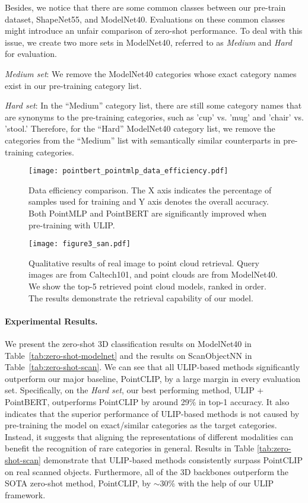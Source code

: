 Besides, we notice that there are some common classes between our pre-train dataset, ShapeNet55, and ModelNet40. Evaluations on these common classes might introduce an unfair comparison of zero-shot performance.
To deal with this issue, we create two more sets in ModelNet40, referred to as \emph{Medium} and \emph{Hard} for evaluation.

\noindent\textit{Medium set}: We remove the ModelNet40 categories whose exact category names exist in our pre-training category list.

\noindent\textit{Hard set}: In the ``Medium'' category list, there are still some category names that are synonyms to the pre-training categories, 
such as 'cup' vs. 'mug' and 'chair' vs. 'stool.' Therefore, for the ``Hard'' ModelNet40 category list, we remove the categories from the ``Medium'' list with semantically similar counterparts in pre-training categories. 

\begin{figure}[htb]
    \centering
    \texttt{[image: pointbert\_pointmlp\_data\_efficiency.pdf]}
    \caption{Data efficiency comparison. The X axis indicates the percentage of samples used for training and Y axis denotes the overall accuracy. Both PointMLP and PointBERT are significantly improved when pre-training with ULIP. }
    \label{fig:data-efficiency}
\end{figure}
\begin{figure*}[htb]
    \centering
    \texttt{[image: figure3\_san.pdf]}
    \caption{Qualitative results of real image to point cloud retrieval. Query images are from Caltech101, and point clouds are from ModelNet40. We show the top-5 retrieved point cloud models, ranked in order. The results demonstrate the retrieval capability of our model.}
    \label{fig:image_pc_retrieval}
\end{figure*}
\paragraph{Experimental Results.}
We present the zero-shot 3D classification results on ModelNet40 in Table~\ref{tab:zero-shot-modelnet} and the results on ScanObjectNN in Table~\ref{tab:zero-shot-scan}. We can see that all ULIP-based methods significantly outperform our major baseline, PointCLIP, by a large margin in every evaluation set.
Specifically, on the \emph{Hard set}, our best performing method, ULIP + PointBERT, outperforms PointCLIP by around 29\% in top-1 accuracy. It also indicates that the superior performance of ULIP-based methods is not caused by pre-training the model on exact/similar categories as the target categories.
Instead, it suggests that aligning the representations of different modalities can benefit the recognition of rare categories in general. Results in Table \ref{tab:zero-shot-scan} demonstrate that ULIP-based methods consistently surpass PointCLIP on real scanned objects. Furthermore, all of the 3D backbones outperform the SOTA zero-shot method, PointCLIP, by $\sim$30\% with the help of our ULIP framework.

